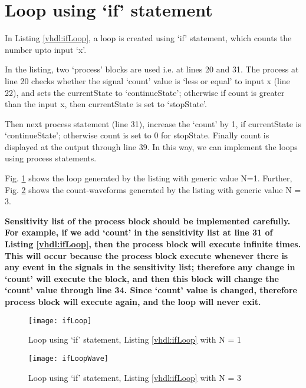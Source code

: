 \section{Loop using `if' statement}\label{sec:ifLoop}
In Listing \ref{vhdl:ifLoop}, a loop is created using `if' statement, which counts the number upto input `x'. 

\begin{explanation}
	In the listing, two `process' blocks are used i.e. at lines 20 and 31. The process at line 20 checks whether the signal `count' value is `less or equal' to input x (line 22), and sets the currentState to `continueState'; otherwise if count is greater than the input x, then currentState is set to `stopState'.
	
	Then next process statement (line 31), increase the `count' by 1, if currentState is `continueState'; otherwise count is set to 0 for stopState. Finally count is displayed at the output through line 39. In this way, we can implement the loops using process statements. 
	
	Fig. \ref{fig:ifLoop} shows the loop generated by the listing with generic value N=1. Further,  Fig. \ref{fig:ifLoopWave} shows the count-waveforms generated by the listing with generic value N = 3.
	
	\textbf{Sensitivity list of the process block should be implemented carefully. For example, if we add `count' in the sensitivity list at line 31 of Listing  \ref{vhdl:ifLoop}, then the process block will execute infinite times. This will occur because the process block execute whenever there is any event in the signals in the sensitivity list; therefore any change in `count' will execute the block, and then this block will change the `count' value through line 34. Since `count' value is changed, therefore process block will execute again, and the loop will never exit.}
	
\end{explanation}


\begin{figure}[!h]
	\centering
	\texttt{[image: ifLoop]}
	\caption{Loop using `if' statement, Listing \ref{vhdl:ifLoop} with N = 1}
	\label{fig:ifLoop}
\end{figure}

\begin{figure}[!h]
	\centering
	\texttt{[image: ifLoopWave]}
	\caption{Loop using `if' statement, Listing \ref{vhdl:ifLoop} with N = 3}
	\label{fig:ifLoopWave}
\end{figure}

